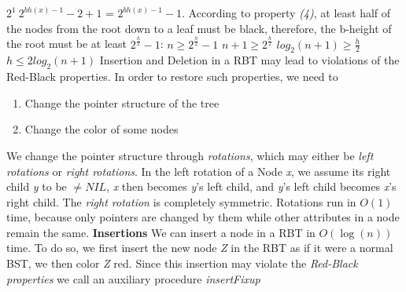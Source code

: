 \documentclass[14pt]{article}
\begin{document}
$2^1 \ 2^{bh(x) - 1} - 2 + 1$ = $2^{bh(x) - 1}- 1$. \newline \newline
According to property \textit{(4)}, at least half of the nodes from the root down to a leaf must be black,
therefore, the b-height of the root must be at least $2^{\frac{h}{2}} - 1$: \newline
$n \geq 2^{\frac{h}{2}} - 1$ \newline \newline
$n + 1 \geq 2^{\frac{h}{2}}$ \newline \newline
$log_2(n + 1) \geq \frac{h}{2}$ \newline \newline
\textbf{$h \leq 2 log_2(n + 1)$} \newline \newline \newline
Insertion and Deletion in a RBT may lead to violations of the Red-Black properties. \newline
In order to restore such properties, we need to
    \begin{enumerate}
        \item Change the pointer structure of the tree
        \item Change the color of some nodes
    \end{enumerate}
We change the pointer structure through \textit{rotations}, which may either be \textit{left rotations}
    or \textit{right rotations}. \newline
In the left rotation of a Node \textit{x}, we assume its right child \textit{y} to be $\neq NIL$, \textit{x} then
    becomes \textit{y}'s left child, and \textit{y}'s left child becomes \textit{x}'s right child. \newline
    The \textit{right rotation} is completely symmetric. \newline
Rotations run in $O(1)$ time, because only pointers are changed by them while other attributes in a node
    remain the same. \newline \newline \newline
\textbf{Insertions} \newline \newline
We can insert a node in a RBT in $O(\log(n))$ time.
To do so, we first insert the new node \textit{Z} in the RBT as if it were a normal BST, we then color \textit{Z} red.
Since this insertion may violate the \textit{Red-Black properties} we call an auxiliary procedure \textit{insertFixup}
\end{document}
